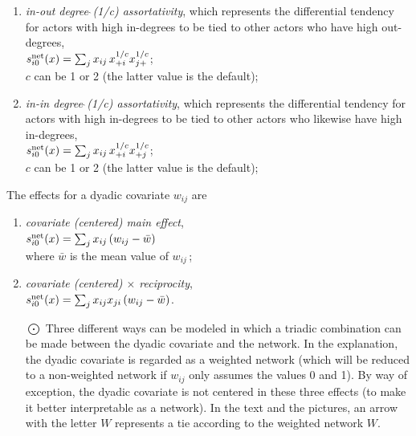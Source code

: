 \documentclass[a4paper,fleqn]{article}
\newcommand{\+}{\, + \,}
\newcommand{\vit}{\theenumi}
\newcounter{savenumi}
\begin{document}
{\begin{enumerate}
 \item {\em in-out degree$\,\hat{\ }$(1/c) assortativity},
 which represents the differential tendency for actors with high in-degrees
 to be tied to other actors who have high out-degrees,\\
 $s^{\rm net}_{i\vit}(x) = \sum_j x_{ij}\, {x_{+i}^{1/c}} {x_{j+}^{1/c}} $;\\
 $c$ can be 1 or 2 (the latter value is the default);

 \item {\em in-in degree$\,\hat{\ }$(1/c) assortativity},
 which represents the differential tendency for actors with high in-degrees
 to be tied to other actors who likewise have high in-degrees,\\
 $s^{\rm net}_{i\vit}(x) = \sum_j x_{ij}\, {x_{+i}^{1/c}} {x_{+j}^{1/c}} $;\\
 $c$ can be 1 or 2 (the latter value is the default);

\setcounter{savenumi}{\value{enumi}}
\end{enumerate}
\smallskip
The effects for a dyadic covariate $w_{ij}$ are
\begin{enumerate}
\setcounter{enumi}{\value{savenumi}}

 \item {\em covariate (centered) main effect},\\
 $s^{\rm net}_{i\vit}(x) = \sum_j x_{ij} \, (w_{ij} - \bar{w}) $\\
 where $\bar{w}$ is the mean value of $w_{ij}\,$;

 \item {\em covariate (centered) $\times$ reciprocity},\\
 $s^{\rm net}_{i\vit}(x) = \sum_j x_{ij} x_{ji} \, (w_{ij} - \bar{w}) $.

 \item[{\hspace*{-1ex}$\bigodot$}]
 Three different ways can be modeled in which
 a triadic combination can be made between
 the dyadic covariate and the network.
 In the explanation, the dyadic covariate
 is regarded as a weighted network
 (which will be reduced to a non-weighted network if $w_{ij}$ only
 assumes the values 0 and 1).
 By way of exception, the dyadic covariate
 is not centered in these three effects
 (to make it better interpretable as a network).
 In the text and the pictures, an arrow with the letter $W$
 represents a tie according to the weighted network $W$.


\end{enumerate}}
\end{document}
